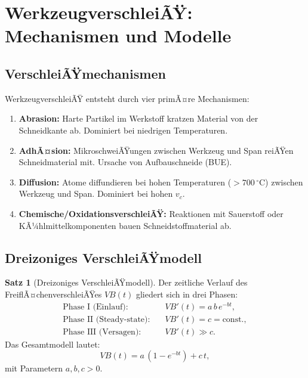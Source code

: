 ﻿\documentclass[a4paper,12pt]{article}
\theoremstyle{definition}
\newtheorem{satz}{Satz}
\begin{document}
\section{WerkzeugverschleiÃŸ: Mechanismen und Modelle}
\label{sec:verschleiss}

\subsection{VerschleiÃŸmechanismen}

WerkzeugverschleiÃŸ entsteht durch vier primÃ¤re Mechanismen:

\begin{enumerate}
  \item \textbf{Abrasion:} Harte Partikel im Werkstoff kratzen Material von der
        Schneidkante ab. Dominiert bei niedrigen Temperaturen.
  \item \textbf{AdhÃ¤sion:} MikroschweiÃŸungen zwischen Werkzeug und Span reiÃŸen
        Schneidmaterial mit. Ursache von Aufbauschneide (BUE).
  \item \textbf{Diffusion:} Atome diffundieren bei hohen Temperaturen
        ($>700\,^{\circ}\mathrm{C}$) zwischen Werkzeug und Span. Dominiert bei
        hohen $v_c$.
  \item \textbf{Chemische/OxidationsverschleiÃŸ:} Reaktionen mit Sauerstoff oder
        KÃ¼hlmittelkomponenten bauen Schneidstoffmaterial ab.
\end{enumerate}

\subsection{Dreizoniges VerschleiÃŸmodell}

\begin{satz}[Dreizoniges VerschleiÃŸmodell]
\label{satz:dreizonen}
  Der zeitliche Verlauf des FreiflÃ¤chenverschleiÃŸes $VB(t)$ gliedert sich in
  drei Phasen:
  \begin{align}
    \text{Phase I (Einlauf):} &\quad VB'(t) = a\,b\,e^{-bt}, \label{eq:phase1} \\
    \text{Phase II (Steady-state):} &\quad VB'(t) = c = \text{const.}, \label{eq:phase2} \\
    \text{Phase III (Versagen):} &\quad VB'(t) \gg c. \label{eq:phase3}
  \end{align}
  Das Gesamtmodell lautet:
  \[
    VB(t) = a\,(1 - e^{-bt}) + c\,t,
  \]
  mit Parametern $a, b, c > 0$.
\end{satz}
\end{document}
